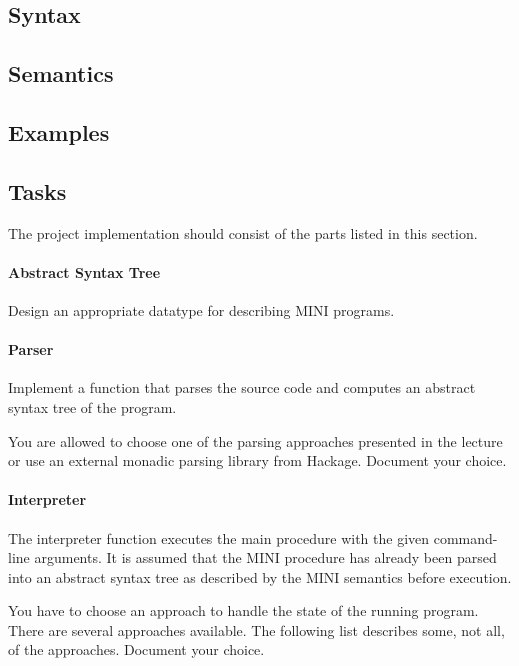 \documentclass{article}
\begin{document}
\subsection{Syntax}


\subsection{Semantics}



\subsection{Examples}

\subsection{Tasks}

The project implementation should consist of the parts listed in this section.

\paragraph{Abstract Syntax Tree}

Design an appropriate datatype for describing MINI programs.

\paragraph{Parser}

Implement a function that parses the source code and computes an abstract syntax tree of the program.

You are allowed to choose one of the parsing approaches presented in the lecture or use an external monadic parsing library from Hackage. Document your choice.

\paragraph{Interpreter}

The interpreter function executes the main procedure with the given command-line arguments. It is assumed that the MINI procedure has already been parsed into an abstract syntax tree as described by the MINI semantics before execution.

You have to choose an approach to handle the state of the running program. There are several approaches available. The following list describes some, not all, of the approaches. Document your choice.
\end{document}
